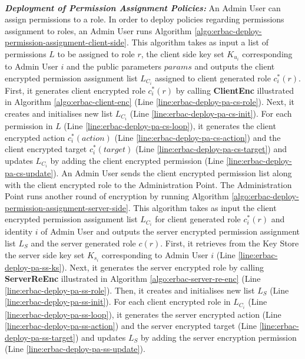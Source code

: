\documentclass[epsfig,a4paper,11pt,titlepage]{book}
\numberwithin{algorithm}{chapter}
\begin{document}
\noindent \\
\noindent \emph{\textbf{Deployment of Permission Assignment Policies:}} 
An Admin User can assign permissions to a role. In order to deploy policies regarding permissions assignment to roles, an Admin User runs Algorithm \ref{algo:erbac-deploy-permission-assignment-client-side}. This algorithm takes as input a list of permissions $L$ to be assigned to role $r$, the client side key set $K_{u_i}$ corresponding to Admin User $i$ and the public parameters $params$ and outputs the client encrypted permission assignment list $L_{C_i}$ assigned to client generated role $c^*_i (r)$. First, it generates client encrypted role $c^*_i (r)$ by calling \textbf{ClientEnc} illustrated in Algorithm \ref{algo:erbac-client-enc} (Line \ref{line:erbac-deploy-pa-cs-role}). Next, it creates and initialises new list $L_{C_i}$ (Line \ref{line:erbac-deploy-pa-cs-init}). For each permission in $L$ (Line \ref{line:erbac-deploy-pa-cs-loop}), it generates the client encrypted action $c^*_i (action)$ (Line \ref{line:erbac-deploy-pa-cs-action}) and the client encrypted target $c^*_i (target)$ (Line \ref{line:erbac-deploy-pa-cs-target}) and updates $L_{C_i}$ by adding the client encrypted permission (Line \ref{line:erbac-deploy-pa-cs-update}). An Admin User sends the client encrypted permission list along with the client encrypted role to the Administration Point. 
The Administration Point runs another round of encryption by running Algorithm \ref{algo:erbac-deploy-permission-assignment-server-side}. This algorithm takes as input the client encrypted permission assignment list $L_{C_i}$ for client generated role $c^*_i (r)$ and identity $i$ of Admin User and outputs the server encrypted permission assignment list $L_{S}$ and the server generated role $c(r)$. First, it retrieves from the Key Store the server side key set $K_{s_i}$ corresponding to Admin User $i$ (Line \ref{line:erbac-deploy-pa-ss-ks}). Next, it generates the server encrypted role by calling \textbf{ServerReEnc} illustrated in Algorithm \ref{algo:erbac-server-re-enc} (Line \ref{line:erbac-deploy-pa-ss-role}). Then, it creates and initialises new list $L_{S}$ (Line \ref{line:erbac-deploy-pa-ss-init}). For each client encrypted role in $L_{C_i}$ (Line \ref{line:erbac-deploy-pa-ss-loop}), it generates the server encrypted action (Line \ref{line:erbac-deploy-pa-ss-action}) and the server encrypted target (Line \ref{line:erbac-deploy-pa-ss-target}) and updates $L_{S}$ by adding the server encryption permission (Line \ref{line:erbac-deploy-pa-ss-update}).
\end{document}
